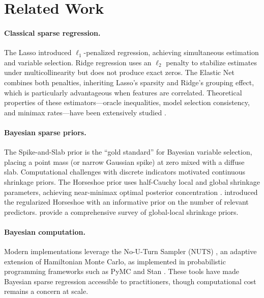 \section{Related Work}
\label{sec:related_work}

\paragraph{Classical sparse regression.}
The Lasso \citep{tibshirani1996regression} introduced $\ell_1$-penalized regression, achieving simultaneous estimation and variable selection.
Ridge regression \citep{hoerl1970ridge} uses an $\ell_2$ penalty to stabilize estimates under multicollinearity but does not produce exact zeros.
The Elastic Net \citep{zou2005regularization} combines both penalties, inheriting Lasso's sparsity and Ridge's grouping effect, which is particularly advantageous when features are correlated.
Theoretical properties of these estimators---oracle inequalities, model selection consistency, and minimax rates---have been extensively studied \citep{buhlmann2011statistics}.

\paragraph{Bayesian sparse priors.}
The Spike-and-Slab prior \citep{mitchell1988bayesian, george1993variable} is the ``gold standard'' for Bayesian variable selection, placing a point mass (or narrow Gaussian spike) at zero mixed with a diffuse slab.
Computational challenges with discrete indicators motivated continuous shrinkage priors.
The Horseshoe prior \citep{carvalho2009handling, carvalho2010horseshoe} uses half-Cauchy local and global shrinkage parameters, achieving near-minimax optimal posterior concentration \citep{vanderpas2014horseshoe}.
\citet{piironen2017sparsity} introduced the regularized Horseshoe with an informative prior on the number of relevant predictors.
\citet{bhadra2019lasso} provide a comprehensive survey of global-local shrinkage priors.

\paragraph{Bayesian computation.}
Modern implementations leverage the No-U-Turn Sampler (NUTS) \citep{hoffman2014no}, an adaptive extension of Hamiltonian Monte Carlo, as implemented in probabilistic programming frameworks such as PyMC \citep{abril2023pymc} and Stan \citep{carpenter2017stan}.
These tools have made Bayesian sparse regression accessible to practitioners, though computational cost remains a concern at scale.

